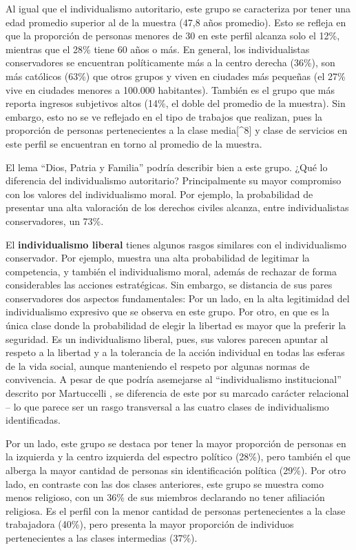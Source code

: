 \documentclass[12pt,twoside]{templates/facsothesis}
\begin{document}
Al igual que el individualismo autoritario, este grupo se caracteriza por tener una edad promedio superior al de la muestra (47,8 años promedio). Esto se refleja en que la proporción de personas menores de 30 en este perfil alcanza solo el 12\%, mientras que el 28\% tiene 60 años o más. En general, los individualistas conservadores se encuentran políticamente más a la centro derecha (36\%), son más católicos (63\%) que otros grupos y viven en ciudades más pequeñas (el 27\% vive en ciudades menores a 100.000 habitantes). También es el grupo que más reporta ingresos subjetivos altos (14\%, el doble del promedio de la muestra). Sin embargo, esto no se ve reflejado en el tipo de trabajos que realizan, pues la proporción de personas pertenecientes a la clase media{[}\^{}8{]} y clase de servicios en este perfil se encuentran en torno al promedio de la muestra.

El lema ``Dios, Patria y Familia'' podría describir bien a este grupo. ¿Qué lo diferencia del individualismo autoritario? Principalmente su mayor compromiso con los valores del individualismo moral. Por ejemplo, la probabilidad de presentar una alta valoración de los derechos civiles alcanza, entre individualistas conservadores, un 73\%.

El \textbf{individualismo liberal} tienes algunos rasgos similares con el individualismo conservador. Por ejemplo, muestra una alta probabilidad de legitimar la competencia, y también el individualismo moral, además de rechazar de forma considerables las acciones estratégicas. Sin embargo, se distancia de sus pares conservadores dos aspectos fundamentales: Por un lado, en la alta legitimidad del individualismo expresivo que se observa en este grupo. Por otro, en que es la única clase donde la probabilidad de elegir la libertad es mayor que la preferir la seguridad. Es un individualismo liberal, pues, sus valores parecen apuntar al respeto a la libertad y a la tolerancia de la acción individual en todas las esferas de la vida social, aunque manteniendo el respeto por algunas normas de convivencia. A pesar de que podría asemejarse al ``individualismo institucional'' descrito por Martuccelli \citeyearpar{martuccelli2010}, se diferencia de este por su marcado carácter relacional -- lo que parece ser un rasgo transversal a las cuatro clases de individualismo identificadas.

Por un lado, este grupo se destaca por tener la mayor proporción de personas en la izquierda y la centro izquierda del espectro político (28\%), pero también el que alberga la mayor cantidad de personas sin identificación política (29\%). Por otro lado, en contraste con las dos clases anteriores, este grupo se muestra como menos religioso, con un 36\% de sus miembros declarando no tener afiliación religiosa. Es el perfil con la menor cantidad de personas pertenecientes a la clase trabajadora (40\%), pero presenta la mayor proporción de individuos pertenecientes a las clases intermedias (37\%).
\end{document}
